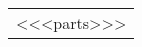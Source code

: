 \documentclass{report}
\newcommand{\ppart}[2]{\parsonbox{12mm}{\large #1}{\makebox[0.35\linewidth][l]{\texttt{\large#2}}}}
\begin{document}
\begin{figure}[h!]
		\centering
		\begin{tabular}{l}
            <<<{parts}>>>
		\end{tabular}
\end{figure}
\end{document}
